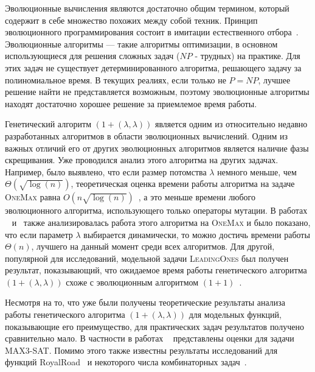 \documentclass[times]{itmo-student-thesis}
\newcommand{\alglambda}{${(1 + (\lambda , \lambda))}$\xspace}
\newcommand{\onemax}{\textsc{OneMax}\xspace}
\newcommand{\leadingones}{\textsc{LeadingOnes}\xspace}
\begin{document}

\tableofcontents

\startprefacepage
Эволюционные вычисления являются достаточно общим термином, который содержит в себе множество похожих между собой техник.
Принцип эволюционного программирования состоит в имитации естественного отбора~\cite{Skobtsov08}.
Эволюционные алгоритмы --- такие алгоритмы оптимизации, в основном использующиеся для решения сложных задач ($NP$ - трудных) на практике.
Для этих задач не существует детерминированного алгоритма, решающего задачу за полиномиальное время.
В текущих реалиях, если только не $P = NP$, лучшее решение найти не представляется возможным, поэтому эволюционные алгоритмы находят достаточно хорошее решение за приемлемое время работы.

Генетический алгоритм \alglambda является одним из относительно недавно разработанных алгоритмов в области эволюционных вычислений. Одним из важных отличий его от других эволюционных алгоритмов является наличие фазы скрещивания.
Уже проводился анализ этого алгоритма на других задачах.
Например, было выявлено, что если размер потомства $\lambda$ немного меньше, чем $\Theta(\sqrt{\log(n)})$, теоретическая оценка времени работы алгоритма на задаче \onemax равна $O(n\sqrt{\log(n)})$~\cite{DoerrD18}, а это меньше времени любого эволюционного алгоритма, использующего только операторы мутации.
В работах ~\cite{DoerrD18} и~\cite{AntipovBD20} также анализировалась работа этого алгоритма на \onemax и было показано, что если параметр $\lambda$ выбирается динамически, то можно достичь времени работы $\Theta(n)$, лучшего на данный момент среди всех алгоритмов.
Для другой, популярной для исследований, модельной задачи  \leadingones был получен результат, показывающий, что ожидаемое время работы генетического алгоритма \alglambda схоже с эволюционным алгоритмом $(1+1)$~\cite{AntipovDK19}.

Несмотря на то, что уже были получены теоретические результаты анализа работы генетического алгоритма \alglambda для модельных функций, показывающие его преимущество, для практических задач результатов получено сравнительно мало.
В частности в работах ~\cite{BuzdalovD17, GoldmanP14} представлены оценки для задачи MAX3-SAT.
Помимо этого также известны результаты исследований для функций RoyalRoad~\cite{DoerrDE15} и некоторого числа комбинаторных задач~\cite{MironovichB15}.
\end{document}

